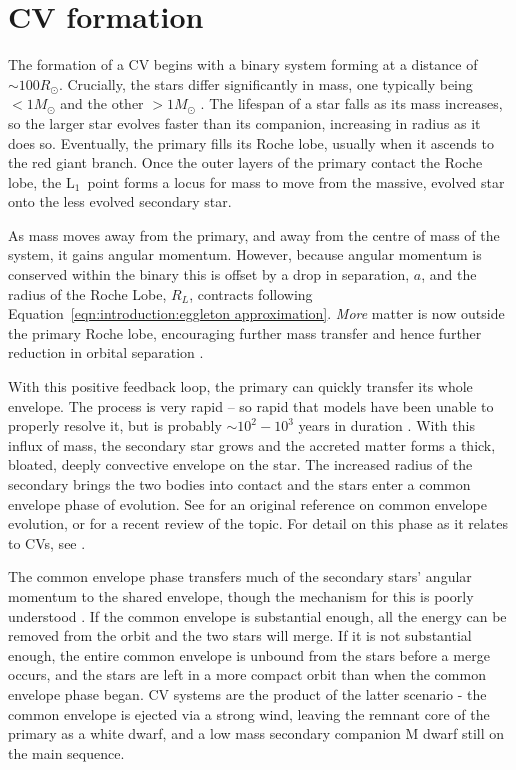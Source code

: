 \section{CV formation}
\label{sect:introduction:formation of CVs}

The formation of a CV begins with a binary system forming at a distance of $\sim 100{R_\odot}$. Crucially, the stars differ significantly in mass, one typically being $<1{M_\odot}$ and the other $>1{M_\odot}$ \citep{Ritter2012}. The lifespan of a star falls as its mass increases, so the larger star evolves faster than its companion, increasing in radius as it does so. Eventually, the primary fills its Roche lobe, usually when it ascends to the red giant branch. 
Once the outer layers of the primary contact the Roche lobe, the $\mathrm L_1$\ point forms a locus for mass to move from the massive, evolved star onto the less evolved secondary star.

As mass moves away from the primary, and away from the centre of mass of the system, it gains angular momentum. However, because angular momentum is conserved within the binary this is offset by a drop in separation, $a$, and the radius of the Roche Lobe, ${R_L}$, contracts following Equation~\ref{eqn:introduction:eggleton approximation}. \textit{More} matter is now outside the primary Roche lobe, encouraging further mass transfer and hence further reduction in orbital separation \citep{Ritter2008}.

With this positive feedback loop, the primary can quickly transfer its whole envelope. The process is very rapid -- so rapid that models have been unable to properly resolve it, but is probably $\sim 10^2 - 10^3$ years in duration \citep{Ritter2012}. With this influx of mass, the secondary star grows and the accreted matter forms a thick, bloated, deeply convective envelope on the star. The increased radius of the secondary brings the two bodies into contact \citep{Ritter2008} and the stars enter a common envelope phase of evolution. See \citet{paczynski1976} for an original reference on common envelope evolution, or \citet{ivanova2020} for a recent review of the topic. For detail on this phase as it relates to CVs, see \citet{taam1978, webbink1984, zorotovic2010, passy2011}.

The common envelope phase transfers much of the secondary stars' angular momentum to the shared envelope, though the mechanism for this is poorly understood \citep{demarco2011}. 
If the common envelope is substantial enough, all the energy can be removed from the orbit and the two stars will merge. 
If it is not substantial enough, the entire common envelope is unbound from the stars before a merge occurs, and the stars are left in a more compact orbit than when the common envelope phase began.
CV systems are the product of the latter scenario - the common envelope is ejected via a strong wind, leaving the remnant core of the primary as a white dwarf, and a low mass secondary companion M dwarf still on the main sequence. 

